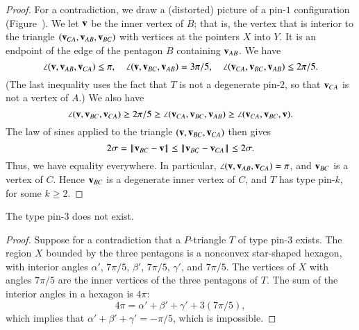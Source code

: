 
\begin{proof} 
  For a contradiction, we draw a (distorted) picture of a pin-$1$
  configuration (Figure~).  We let ${\mathbf v}$ be the inner
  vertex of $B$; that is, the vertex that is interior to the triangle
  $({\mathbf v}_{CA},{\mathbf v}_{AB},{\mathbf v}_{BC})$ with vertices at the pointers $X$ into
  $Y$.  It is an endpoint of the edge of the pentagon $B$ containing
  ${\mathbf v}_{AB}$.  We have
\[
\angle ({\mathbf v},{\mathbf v}_{AB},{\mathbf v}_{CA}) \le \pi,\quad 
\angle({\mathbf v},{\mathbf v}_{BC},{\mathbf v}_{AB}) = 3\pi/5,\quad
\angle({\mathbf v}_{CA},{\mathbf v}_{BC},{\mathbf v}_{AB})\le 2\pi/5.
\]
(The last inequality uses the fact that $T$ is not a degenerate
pin-$2$, so that ${\mathbf v}_{CA}$ is not a vertex of $A$.)  We also have
\[
\angle({\mathbf v},{\mathbf v}_{BC},{\mathbf v}_{CA}) \ge 2\pi /5 
\ge \angle({\mathbf v}_{CA},{\mathbf v}_{BC},{\mathbf v}_{AB}) \ge \angle({\mathbf v}_{CA},{\mathbf v}_{BC},{\mathbf v}).
\]
The law of sines applied to the triangle $({\mathbf v},{\mathbf v}_{BC},{\mathbf v}_{CA})$ then
gives
\[
2\sigma =\norm{\v_{BC}}{\v}\le\norm{\v_{BC}}{\v_{CA}}\le 2\sigma.
\]
Thus, we have equality everywhere.  In particular,
$\angle({\mathbf v},{\mathbf v}_{AB},{\mathbf v}_{CA})=\pi$, and ${\mathbf v}_{BC}$ is a vertex of $C$.
Hence ${\mathbf v}_{BC}$ is a degenerate inner vertex of $C$, and $T$ has type
pin-$k$, for some $k\ge 2$.
\end{proof}

\begin{lemma}  The type pin-$3$ does not exist.  
\end{lemma}

\begin{proof} 
  Suppose for a contradiction that a $P$-triangle $T$ of type pin-$3$
  exists.  The region $X$ bounded by the three pentagons is a
  nonconvex star-shaped hexagon, with interior angles $\alpha'$,
  $7\pi/5$, $\beta'$, $7\pi/5$, $\gamma'$, and $7\pi/5$.  The vertices
  of $X$ with angles $7\pi/5$ are the inner vertices of the three
  pentagons of $T$.  The sum of the interior angles in a hexagon is
  $4\pi$:
\[
4\pi = \alpha'+\beta'+\gamma' + 3 (7\pi/5),
\]
which implies that $\alpha'+\beta'+\gamma' = -\pi/5$, which is
impossible.
\end{proof}

